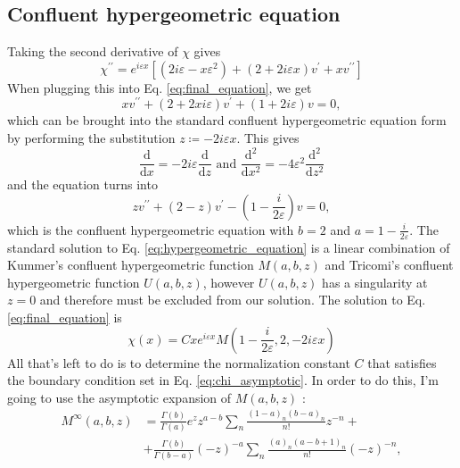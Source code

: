 \subsection{Confluent hypergeometric equation}
Taking the second derivative of \(\chi \) gives
\begin{equation}
	\chi ^{\prime\prime} = e^{i\varepsilon x} \left[ (2i\varepsilon - x \varepsilon ^2) + (2 + 2 i \varepsilon x ) v^{\prime} + x v^{\prime\prime}   \right] 
\end{equation}
When plugging this into Eq. \eqref{eq:final_equation}, we get
\begin{equation}
	x v^{\prime\prime} + (2 + 2 x i \varepsilon ) v^{\prime} + (1 + 2i \varepsilon ) v = 0,
\end{equation}
which can be brought into the standard confluent hypergeometric equation form by performing the substitution \(z \coloneqq - 2i \varepsilon x\). This gives
\begin{equation}
	\frac{\mathrm{d}}{\mathrm{d}x} = - 2 i \varepsilon \frac{\mathrm{d}}{\mathrm{d}z} 
	\text{ and } 
	\frac{\mathrm{d}^2}{\mathrm{d}x^2} = - 4 \varepsilon ^2 \frac{\mathrm{d}^2}{\mathrm{d}z^2} 
\end{equation}
and the equation turns into
\begin{equation}\label{eq:hypergeometric_equation}
	z v^{\prime\prime} + (2-z) v^{\prime} - \left( 1- \frac{i}{2\varepsilon } \right) v = 0,
\end{equation}
which is the confluent hypergeometric equation with \(b=2\) and \(a=1- \frac{i}{2\varepsilon }\).
The standard solution to Eq. \eqref{eq:hypergeometric_equation} is a linear combination of Kummer's confluent hypergeometric function \(M(a,b,z)\) and Tricomi's confluent hypergeometric function \(U(a,b,z)\), however \(U(a,b,z)\) has a singularity at \(z=0\) and therefore must be excluded from our solution. The solution to Eq. \eqref{eq:final_equation} is
\begin{equation}
	\chi (x) = Cxe^{i\varepsilon x} M\left(1-\frac{i}{2\varepsilon }, 2, -2i\varepsilon x\right)
\end{equation}
All that's left to do is to determine the normalization constant \(C\) that satisfies the boundary condition set in Eq. \eqref{eq:chi_asymptotic}. In order to do this, I'm going to use the asymptotic expansion of \(M(a,b,z)\) \cite[\href{https://dlmf.nist.gov/13.7.E2}{(13.7.2)}]{NIST:DLMF}:
\begin{align}
	M^{\infty} (a,b,z)&= 
	\frac{\Gamma (b)}{\Gamma (a)} e^z z^{a-b} \sum_{n} \frac{(1-a)_n (b-a)_n}{n!}z^{-n} +\\
	&+ \frac{\Gamma (b)}{\Gamma (b-a)}(-z)^{-a} \sum_{n} \frac{(a)_n(a-b+1)_n}{n!}(-z)^{-n},
\end{align}
